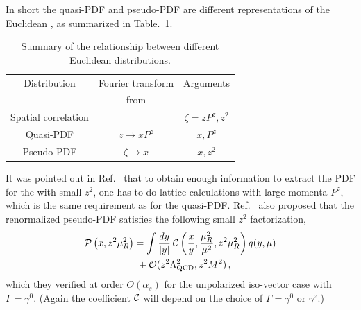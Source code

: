 In short the quasi-PDF and pseudo-PDF are different representations of the Euclidean \spcorr, as summarized in Table.~\ref{tab:I}.
\begin{table}
\begin{center}
	\begin{tabular}{ | c | c | c |}
		\hline
		Distribution & Fourier transform & Arguments\\[-2pt]
		& from \spcorr & \\ \hline
		Spatial correlation  &  & $\zeta = zP^z, z^2$\\ \hline
		Quasi-PDF & $z\to xP^z$ & $x, P^z$\\ \hline
		Pseudo-PDF & $\zeta \to x$ & $x, z^2$\\ \hline
	\end{tabular}
\caption{Summary of the relationship between different Euclidean distributions.}
\label{tab:I}
\end{center}
\end{table}

It was pointed out in Ref.~\cite{Ji:2017rah} that to obtain enough information to extract the PDF for the \spcorr with small $z^2$, one has to do lattice calculations with large momenta $P^z$, which is the same requirement as for the quasi-PDF. Ref.~\cite{Ji:2017rah} also proposed that the renormalized pseudo-PDF satisfies the following small $z^2$ factorization,
\begin{align} \label{eq:pseudofact}
	\mathcal{P} \left( x, z^2\mu_R^2\right)
  &= \int {dy\over |y|}\: \mathcal{C}\left({x\over y}, {\mu_R^2\over \mu^2},z^2\mu_R^2\right) q(y,\mu)
   \\
  &\ + {\cal O}(z^2\Lambda_{\rm QCD}^2, z^2 M^2) \,,\nonumber
\end{align}
which they verified at order $O(\alpha_s)$ for the unpolarized iso-vector case with $\Gamma=\gamma^0$.  (Again the coefficient ${\cal C}$ will depend on the choice of $\Gamma=\gamma^0$ or $\gamma^z$.)

